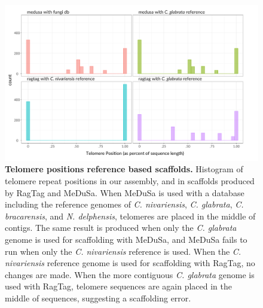 \begin{figure}[!ht]
\centering
\includegraphics[width = 1\linewidth,keepaspectratio]{figure/telopos.pdf}
\caption[Telomere positions reference based scaffolds]{{\bf Telomere positions reference based scaffolds.} Histogram of telomere repeat positions in our assembly, and in scaffolds produced by RagTag and MeDuSa. When MeDuSa is used with a database including the reference genomes of \textit{C. nivariensis}, \textit{C. glabrata}, \textit{C. bracarensis}, and \textit{N. delphensis}, telomeres are placed in the middle of contigs. The same result is produced when only the \textit{C. glabrata} genome is used for scaffolding with MeDuSa, and MeDuSa fails to run when only the \textit{C. nivariensis} reference is used. When the \textit{C. nivariensis} reference genome is used for scaffolding with RagTag, no changes are made. When the more contiguous \textit{C. glabrata} genome is used with RagTag, telomere sequences are again placed in the middle of sequences, suggesting a scaffolding error. }
\label{fig:telopos}
\end{figure}



